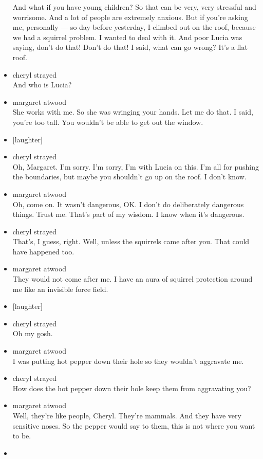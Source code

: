 \begin{itemize}
  And what if you have young children? So that can be very, very
  stressful and worrisome. And a lot of people are extremely anxious.
  But if you're asking me, personally --- so day before yesterday, I
  climbed out on the roof, because we had a squirrel problem. I wanted
  to deal with it. And poor Lucia was saying, don't do that! Don't do
  that! I said, what can go wrong? It's a flat roof.
\item
  cheryl strayed\\
  And who is Lucia?
\item
  margaret atwood\\
  She works with me. So she was wringing your hands. Let me do that. I
  said, you're too tall. You wouldn't be able to get out the window.
\item
  {[}laughter{]}
\item
  cheryl strayed\\
  Oh, Margaret. I'm sorry. I'm sorry, I'm with Lucia on this. I'm all
  for pushing the boundaries, but maybe you shouldn't go up on the roof.
  I don't know.
\item
  margaret atwood\\
  Oh, come on. It wasn't dangerous, OK. I don't do deliberately
  dangerous things. Trust me. That's part of my wisdom. I know when it's
  dangerous.
\item
  cheryl strayed\\
  That's, I guess, right. Well, unless the squirrels came after you.
  That could have happened too.
\item
  margaret atwood\\
  They would not come after me. I have an aura of squirrel protection
  around me like an invisible force field.
\item
  {[}laughter{]}
\item
  cheryl strayed\\
  Oh my gosh.
\item
  margaret atwood\\
  I was putting hot pepper down their hole so they wouldn't aggravate
  me.
\item
  cheryl strayed\\
  How does the hot pepper down their hole keep them from aggravating
  you?
\item
  margaret atwood\\
  Well, they're like people, Cheryl. They're mammals. And they have very
  sensitive noses. So the pepper would say to them, this is not where
  you want to be.
\item

\end{itemize}
